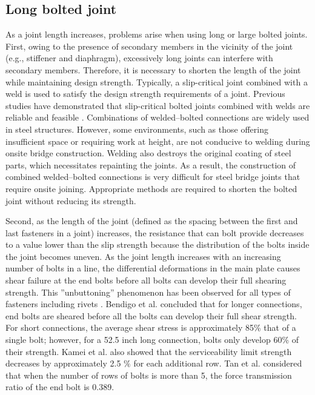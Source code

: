 \subsection{Long bolted joint}

As a joint length increases, problems arise when using  long or large bolted joints. First, owing to the presence of secondary members in the vicinity of the joint (e.g., stiffener and diaphragm), excessively long joints can interfere with secondary members. Therefore, it is necessary to shorten the length of the joint while maintaining design strength. Typically, a slip-critical joint combined with a weld is used to satisfy the design strength requirements of a joint. Previous studies have demonstrated that slip-critical bolted joints combined with welds are reliable and feasible \cite{solodov2021,Thomas2000,Chang2019361,KHANDEL2022107036}. Combinations of welded--bolted connections are widely used in steel structures. However, some environments, such as those offering insufficient space or requiring work at height, are not conducive to welding during onsite bridge construction. Welding also destroys the original coating of steel parts, which necessitates repainting the joints. As a result, the construction of combined welded--bolted connections is very difficult for steel bridge joints that require onsite joining. Appropriate methods are required to shorten the bolted joint without reducing its strength. \par

Second, as the length of the joint (defined as the spacing between the first and last fasteners in a joint) increases, the resistance that can bolt provide decreases to a value lower than the slip strength because the distribution of the bolts inside the joint becomes uneven. As the joint length increases with an increasing number of bolts in a line, the differential deformations in the main plate causes shear failure at the end bolts before all bolts can develop their full shearing strength. This ''unbuttoning'' phenomenon has been observed for all types of fasteners including rivets \cite{fisher1965behavior}. Bendigo et al.\cite{bendigo1963long} concluded that for longer connections, end bolts are sheared before all the bolts can develop their full shear strength. For short connections, the average shear stress is approximately 85\% that of a single bolt; however, for a 52.5 inch long connection, bolts only develop 60\% of their strength. Kamei et al. \cite{KAMEI2000} also showed that the serviceability limit strength decreases by approximately 2.5 $\%$ for each additional row.  Tan et al.\cite{Tan2022} considered that when the number of rows of bolts is more than 5, the force transmission ratio of the end bolt is 0.389.

